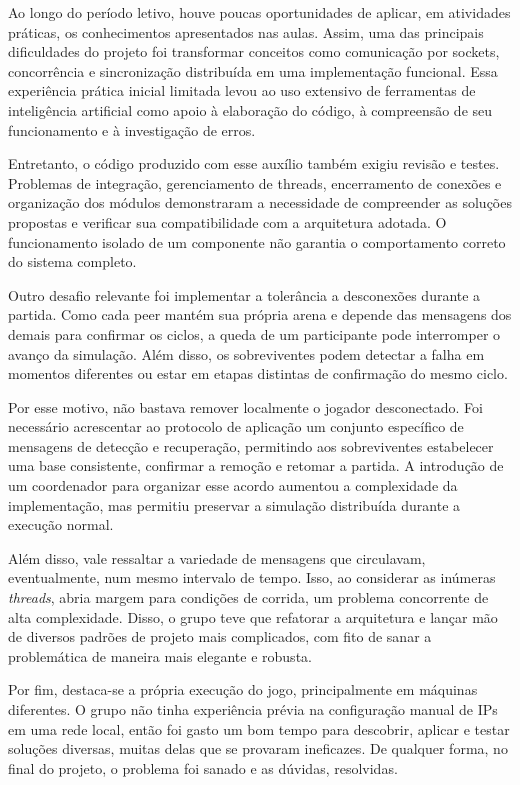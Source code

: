\documentclass[11pt,a4paper]{article}
\begin{document}
\begin{description}
Ao longo do período letivo, houve poucas oportunidades de aplicar, em atividades práticas, os conhecimentos apresentados nas aulas. Assim, uma das principais dificuldades do projeto foi transformar conceitos como comunicação por sockets, concorrência e sincronização distribuída em uma implementação funcional. Essa experiência prática inicial limitada levou ao uso extensivo de ferramentas de inteligência artificial como apoio à elaboração do código, à compreensão de seu funcionamento e à investigação de erros.

Entretanto, o código produzido com esse auxílio também exigiu revisão e testes. Problemas de integração, gerenciamento de threads, encerramento de conexões e organização dos módulos demonstraram a necessidade de compreender as soluções propostas e verificar sua compatibilidade com a arquitetura adotada. O funcionamento isolado de um componente não garantia o comportamento correto do sistema completo.

Outro desafio relevante foi implementar a tolerância a desconexões durante a partida. Como cada peer mantém sua própria arena e depende das mensagens dos demais para confirmar os ciclos, a queda de um participante pode interromper o avanço da simulação. Além disso, os sobreviventes podem detectar a falha em momentos diferentes ou estar em etapas distintas de confirmação do mesmo ciclo.

Por esse motivo, não bastava remover localmente o jogador desconectado. Foi necessário acrescentar ao protocolo de aplicação um conjunto específico de mensagens de detecção e recuperação, permitindo aos sobreviventes estabelecer uma base consistente, confirmar a remoção e retomar a partida. A introdução de um coordenador para organizar esse acordo aumentou a complexidade da implementação, mas permitiu preservar a simulação distribuída durante a execução normal.

Além disso, vale ressaltar a variedade de mensagens que circulavam, eventualmente, num mesmo intervalo de tempo. Isso, ao considerar as inúmeras \textit{threads}, abria margem para condições de corrida, um problema concorrente de alta complexidade. Disso, o grupo teve que refatorar a arquitetura e lançar mão de diversos padrões de projeto mais complicados, com fito de sanar a problemática de maneira mais elegante e robusta.

Por fim, destaca-se a própria execução do jogo, principalmente em máquinas diferentes. O grupo não tinha experiência prévia na configuração manual de IPs em uma rede local, então foi gasto um bom tempo para descobrir, aplicar e testar soluções diversas, muitas delas que se provaram ineficazes. De qualquer forma, no final do projeto, o problema foi sanado e as dúvidas, resolvidas.


\end{description}
\end{document}

